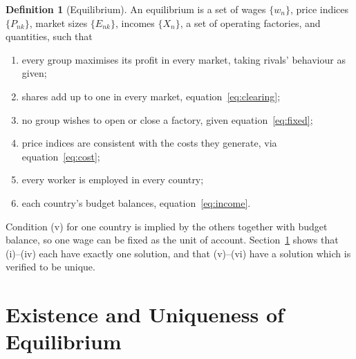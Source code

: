 \documentclass[11pt]{article}
\theoremstyle{plain}
\theoremstyle{remark}
\theoremstyle{definition}
\newtheorem{definition}{Definition}
\begin{document}
\begin{definition}[Equilibrium]\label{def:eq}
An equilibrium is a set of wages $\{w_n\}$, price indices $\{P_{nk}\}$, market sizes
$\{E_{nk}\}$, incomes $\{X_n\}$, a set of operating factories, and quantities, such
that
\begin{enumerate}[label=(\roman*)]
\item every group maximises its profit in every market, taking rivals' behaviour as
given;
\item shares add up to one in every market, equation~\eqref{eq:clearing};
\item no group wishes to open or close a factory, given equation~\eqref{eq:fixed};
\item price indices are consistent with the costs they generate, via
equation~\eqref{eq:cost};
\item every worker is employed in every country;
\item each country's budget balances, equation~\eqref{eq:income}.
\end{enumerate}
\end{definition}

\noindent Condition (v) for one country is implied by the others together with
budget balance, so one wage can be fixed as the unit of account. Section~\ref{part:proofs} shows that
(i)--(iv) each have exactly one solution, and that (v)--(vi) have a solution which is
verified to be unique.

\newpage
\section{Existence and Uniqueness of Equilibrium}
\label{part:proofs}
\end{document}
